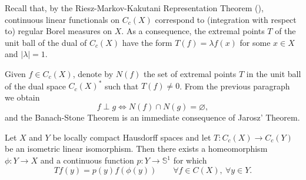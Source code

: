 Recall that, by the Riesz-Markov-Kakutani Representation Theorem (\cite[Theorem 2.14]{MR924157}), continuous linear functionals on $C_c(X)$ correspond to (integration with respect to) regular Borel measures on $X$. As a consequence, the extremal points $T$ of the unit ball of the dual of $C_c(X)$ have the form $T(f)=\lambda f(x)$ for some $x\in X$ and $|\lambda|=1$.



Given $f\in C_c(X)$, denote by $N(f)$ the set of extremal points $T$ in the unit ball of the dual space $C_c(X)^*$ such that $T(f)\neq 0$. From the previous paragraph we obtain
\[f\perp g\iff N(f)\cap N(g)=\varnothing\tag{BS},\]
and the Banach-Stone Theorem is an immediate consequence of Jarosz' Theorem.

\begin{theorem}\label{theorembanachstone}
Let $X$ and $Y$ be locally compact Hausdorff spaces and let $T:C_c(X)\to C_c(Y)$ be an isometric linear isomorphism. Then there exists a homeomorphism $\phi:Y\to X$ and a continuous function $p:Y\to\mathbb{S}^1$ for which
\[Tf(y)=p(y)f(\phi(y))\qquad\forall f\in C(X),\ \forall y\in Y.\]
\end{theorem}

